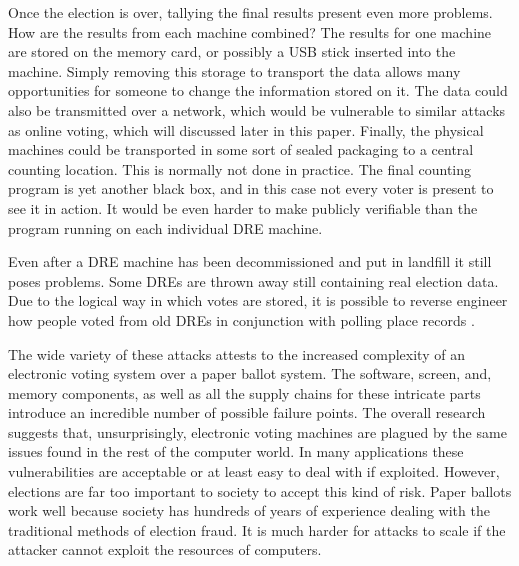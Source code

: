 \documentclass[12pt, titlepage]{article}
\begin{document}
Once the election is over, tallying the final results present even more problems. How are the results from each machine combined? The results for one machine are stored on the memory card, or possibly a USB stick inserted into the machine. Simply removing this storage to transport the data allows many opportunities for someone to change the information stored on it. The data could also be transmitted over a network, which would be vulnerable to similar attacks as online voting, which will discussed later in this paper. Finally, the physical machines could be transported in some sort of sealed packaging to a central counting location. This is normally not done in practice. The final counting program is yet another black box, and in this case not every voter is present to see it in action. It would be even harder to make publicly verifiable than the program running on each individual DRE machine.

Even after a DRE machine has been decommissioned and put in landfill it still poses problems. Some DREs are thrown away still containing real election data. Due to the logical way in which votes are stored, it is possible to reverse engineer how people voted from old DREs in conjunction with polling place records \cite{hao2016real}.

The wide variety of these attacks attests to the increased complexity of an electronic voting system over a paper ballot system. The software, screen, and, memory components, as well as all the supply chains for these intricate parts introduce an incredible number of possible failure points. The overall research suggests that, unsurprisingly, electronic voting machines are plagued by the same issues found in the rest of the computer world. In many applications these vulnerabilities are acceptable or at least easy to deal with if exploited. However, elections are far too important to society to accept this kind of risk. Paper ballots work well because society has hundreds of years of experience dealing with the traditional methods of election fraud. It is much harder for attacks to scale if the attacker cannot exploit the resources of computers.
\end{document}
